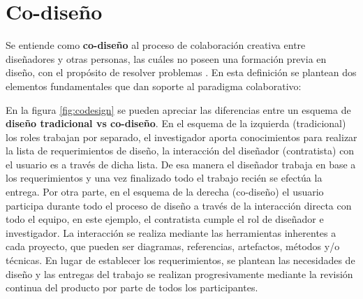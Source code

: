 \section{Co-diseño}
 Se entiende como \textbf{co-diseño} al  proceso de colaboración creativa entre diseñadores y otras personas, las cuáles no poseen una formación previa en diseño, con el propósito de resolver problemas  \citep{PerezGarcia2014}.  
 En esta definición se plantean dos elementos fundamentales que dan soporte al paradigma colaborativo:


En la figura \ref{fig:codesign} se pueden apreciar las diferencias entre un esquema de \textbf{diseño tradicional vs co-diseño}. En el esquema de la izquierda (tradicional) los roles trabajan por separado, el investigador aporta conocimientos para realizar la lista de requerimientos de diseño, la interacción del diseñador (contratista) con el usuario es a través de dicha lista. De esa manera el diseñador trabaja en base a los requerimientos y una vez finalizado todo el trabajo recién se efectúa la entrega. Por otra parte, en el esquema de la derecha (co-diseño) el usuario participa durante todo el proceso de diseño a través de la  interacción directa con todo el equipo, en este ejemplo, el contratista cumple el rol de diseñador e investigador. La  interacción se realiza mediante las herramientas inherentes a cada proyecto, que pueden ser diagramas, referencias, artefactos, métodos y/o técnicas. En lugar de establecer los requerimientos, se plantean las necesidades de diseño y las entregas del trabajo se realizan progresivamente mediante la revisión continua del producto por parte de todos los participantes. 


